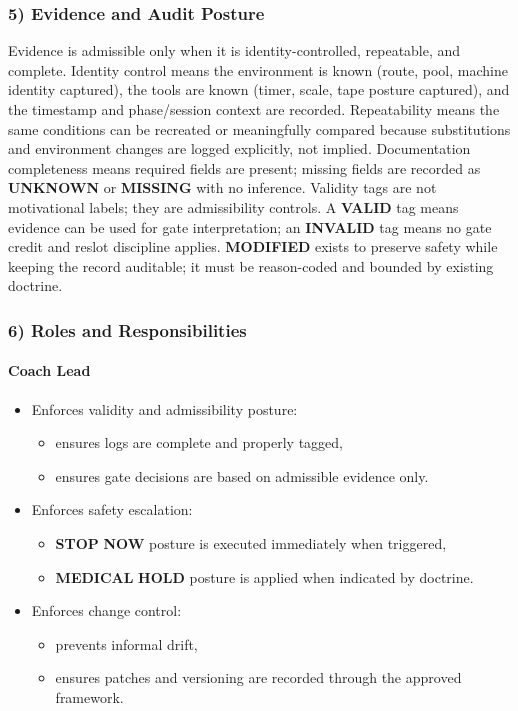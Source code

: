 \documentclass[10pt]{article}
\begin{document}
\subsubsection*{5) Evidence and Audit Posture}

Evidence is admissible only when it is identity-controlled, repeatable, and complete. Identity control means the environment is known (route, pool, machine identity captured), the tools are known (timer, scale, tape posture captured), and the timestamp and phase/session context are recorded. Repeatability means the same conditions can be recreated or meaningfully compared because substitutions and environment changes are logged explicitly, not implied. Documentation completeness means required fields are present; missing fields are recorded as \textbf{UNKNOWN} or \textbf{MISSING} with no inference. Validity tags are not motivational labels; they are admissibility controls. A \textbf{VALID} tag means evidence can be used for gate interpretation; an \textbf{INVALID} tag means no gate credit and reslot discipline applies. \textbf{MODIFIED} exists to preserve safety while keeping the record auditable; it must be reason-coded and bounded by existing doctrine.

\subsubsection*{6) Roles and Responsibilities}

\paragraph*{Coach Lead}

\begin{itemize}
\item Enforces validity and admissibility posture:
  \begin{itemize}
  \item ensures logs are complete and properly tagged,
  \item ensures gate decisions are based on admissible evidence only.
  \end{itemize}
\item Enforces safety escalation:
  \begin{itemize}
  \item \textbf{STOP} \textbf{NOW} posture is executed immediately when triggered,
  \item \textbf{MEDICAL} \textbf{HOLD} posture is applied when indicated by doctrine.
  \end{itemize}
\item Enforces change control:
  \begin{itemize}
  \item prevents informal drift,
  \item ensures patches and versioning are recorded through the approved framework.
  \end{itemize}
\end{itemize}
\end{document}
